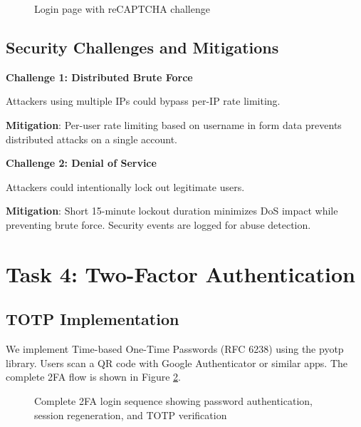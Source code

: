 \documentclass[12pt,a4paper]{article}
\begin{document}
\begin{figure}[H]
    \centering
    \caption{Login page with reCAPTCHA challenge}
    \label{fig:captcha}
\end{figure}

\subsection{Security Challenges and Mitigations}

\textbf{Challenge 1: Distributed Brute Force}

Attackers using multiple IPs could bypass per-IP rate limiting.

\textbf{Mitigation}: Per-user rate limiting based on username in form data prevents distributed attacks on a single account.

\textbf{Challenge 2: Denial of Service}

Attackers could intentionally lock out legitimate users.

\textbf{Mitigation}: Short 15-minute lockout duration minimizes DoS impact while preventing brute force. Security events are logged for abuse detection.

\section{Task 4: Two-Factor Authentication}

\subsection{TOTP Implementation}

We implement Time-based One-Time Passwords (RFC 6238) using the pyotp library. Users scan a QR code with Google Authenticator or similar apps. The complete 2FA flow is shown in Figure \ref{fig:2fa_flow}.

\begin{figure}[H]
    \centering
    
    \caption{Complete 2FA login sequence showing password authentication, session regeneration, and TOTP verification}
    \label{fig:2fa_flow}
\end{figure}
\end{document}
